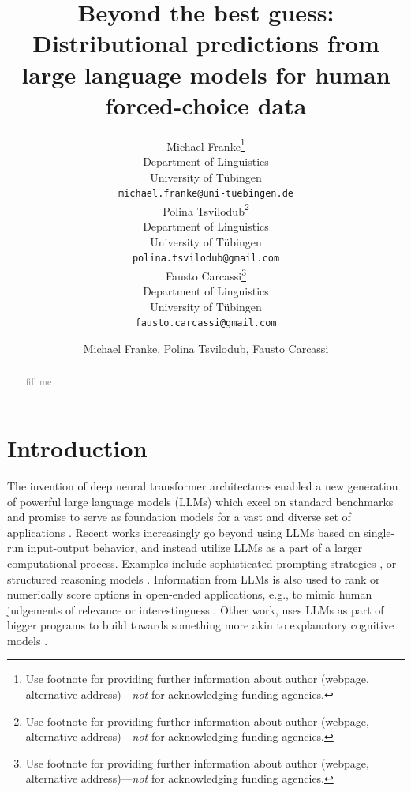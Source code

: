 \documentclass[fleqn]{article}
\title{Beyond the best guess: Distributional predictions from large language models for human forced-choice data}
\date{}
\author{ Michael Franke\thanks{Use footnote for providing further
		information about author (webpage, alternative
		address)---\emph{not} for acknowledging funding agencies.} \\
	Department of Linguistics\\
	University of Tübingen\\
	\texttt{michael.franke@uni-tuebingen.de} \\
	\And
	Polina Tsvilodub\thanks{Use footnote for providing further
		information about author (webpage, alternative
		address)---\emph{not} for acknowledging funding agencies.} \\
	Department of Linguistics\\
	University of Tübingen\\
	\texttt{polina.tsvilodub@gmail.com} \\
	\And
	Fausto Carcassi\thanks{Use footnote for providing further
		information about author (webpage, alternative
		address)---\emph{not} for acknowledging funding agencies.} \\
	Department of Linguistics\\
	University of Tübingen\\
	\texttt{fausto.carcassi@gmail.com} \\
}
\author{Michael Franke, Polina Tsvilodub, Fausto Carcassi}
\affil{Department of Linguistics\\University of Tübingen\\
\texttt{[michael.franke|polina.tsvilodub|fausto.carcassi]@uni-tuebingen.de}}
\begin{document}
\maketitle

\begin{abstract}
	{\textcolor{gray}{fill me}}
\end{abstract}



\section{Introduction}
\label{sec:introduction}

The invention of deep neural transformer architectures \citep{VaswaniShazeer2017:Attention-is-Al} enabled a new generation of powerful large language models (LLMs) \citep{DevlinChang2019:BERT:-Pre-train,ChungHou2022:Scaling-Instruc,OpenAI2023:GPT-4-Technical,TouvronLavril2023:LLaMA:-Open-and} which excel on standard benchmarks and promise to serve as foundation models for a vast and diverse set of applications \citep{BommasaniHudson2021:On-the-opportun}.
Recent works increasingly go beyond using LLMs based on single-run input-output behavior, and instead utilize LLMs as a part of a larger computational process.
Examples include sophisticated prompting strategies \citep[e.g.,][]{LiuLiu2022:Generated-Knowl}, or structured reasoning models \citep[e.g.,][]{CreswellShanahan2022:Selection-Infer,GaoMadaan2023:PAL:-Program-ai,ParanjapeLundberg2023:ART:-Automatic-}.
Information from LLMs is also used  to rank or numerically score options in open-ended applications, e.g., to mimic human judgements of relevance or interestingness \citep[e.g.,][]{ParkOBrien2023:Generative-Agen,ZhangLehman2023:OMNI:-Open-ende}.
Other work, uses LLMs as part of bigger programs to build towards something more akin to explanatory cognitive models \citep[e.g.,][]{WongGrand2023:From-Word-Model}.
\end{document}
